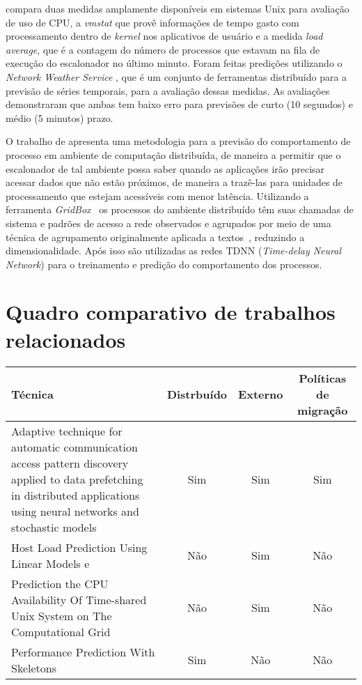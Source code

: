  compara duas medidas amplamente disponíveis
em sistemas Unix para avaliação de uso de CPU, a \emph{vmstat} que provê
informações de tempo gasto com processamento dentro de \emph{kernel} nos
aplicativos de usuário e a medida \emph{load average}, que é a contagem do
número de processos que estavam na fila de execução do escalonador no último
minuto. Foram feitas predições utilizando o \emph{Network Weather Service}
\cite{wolski1999network}, que é um conjunto de ferramentas distribuído para a
previsão de séries temporais, para a avaliação dessas medidas. As avaliações
demonstraram que ambas tem baixo erro para previsões de curto (10 segundos) e
médio (5 minutos) prazo.

O trabalho de  apresenta uma metodologia para a
previsão do comportamento de processo em ambiente de computação distribuída, de
maneira a permitir que o escalonador de tal ambiente possa saber quando as
aplicações irão precisar acessar dados que não estão próximos, de maneira a
trazê-las para unidades de processamento que estejam acessíveis com menor
latência. Utilizando a ferramenta \emph{GridBox}~\cite{dodonov2004gridbox} os
processos do ambiente distribuído têm suas chamadas de sistema e padrões de
acesso a rede observados e agrupados por meio de uma técnica de agrupamento
originalmente aplicada a textos~\cite{de2005automatic}, reduzindo a
dimensionalidade. Após isso são utilizadas as redes TDNN (\emph{Time-delay
Neural Network}) para o treinamento e predição do comportamento dos processos.

\section{Quadro comparativo de trabalhos relacionados}

\begin{table}
\centering
\hspace{-2cm} %
\label{quadro:relacionados}
\begin{tabular}{| m{5cm} | c | c | c |}
\hline
Técnica & Distrbuído & Externo & Políticas de migração \\
\hline
Adaptive technique for automatic communication access pattern discovery applied
to data prefetching in distributed applications using neural networks and
stochastic models \cite{dodonov2006adaptive} & Sim & Sim & Sim \\
\hline
Host Load Prediction Using Linear Models \cite{dinda2000host}
e \cite{dinda2002evaluation} & Não & Sim & Não \\
\hline
Prediction the CPU Availability Of Time-shared Unix System on The Computational
Grid \cite{wolski2000predicting} & Não & Sim & Não \\
\hline
Performance Prediction With Skeletons \cite{sodhi2008performance} & Sim & Não & Não \\
\hline

\end{tabular}
\end{table}

